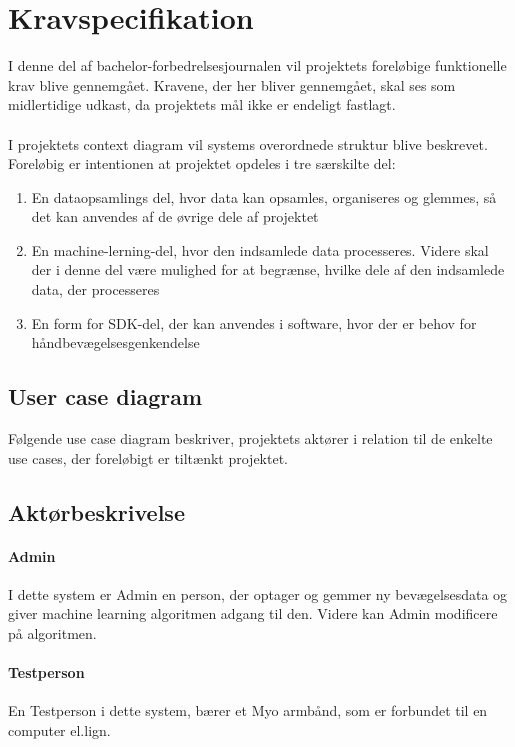 \thispagestyle{fancy}
\chapter{Kravspecifikation}
I denne del af bachelor-forbedrelsesjournalen vil projektets foreløbige funktionelle krav blive gennemgået. Kravene, der her bliver gennemgået, skal ses som midlertidige udkast, da projektets mål ikke er endeligt fastlagt.
\\ \\
I projektets context diagram vil systems overordnede struktur blive beskrevet. \\
Foreløbig er intentionen at projektet opdeles i tre særskilte del:\\
\begin{enumerate}
	\item En dataopsamlings del, hvor data kan opsamles, organiseres og glemmes, så det kan anvendes af de øvrige dele af projektet
	\item En machine-lerning-del, hvor den indsamlede data processeres. Videre skal der i denne del være mulighed for at begrænse, hvilke dele af den indsamlede data, der processeres
	\item En form for SDK-del, der kan anvendes i software, hvor der er behov for håndbevægelsesgenkendelse
	
\end{enumerate}
\section{User case diagram}
Følgende use case diagram beskriver, projektets aktører i relation til de enkelte use cases, der foreløbigt er tiltænkt projektet.

\section{Aktørbeskrivelse}
\subsubsection*{Admin}
I dette system er Admin en person, der optager og gemmer ny bevægelsesdata og giver machine learning algoritmen adgang til den. Videre kan Admin modificere på algoritmen.

\subsubsection*{Testperson}
En Testperson i dette system, bærer et Myo armbånd, som er forbundet til en computer el.lign.   

